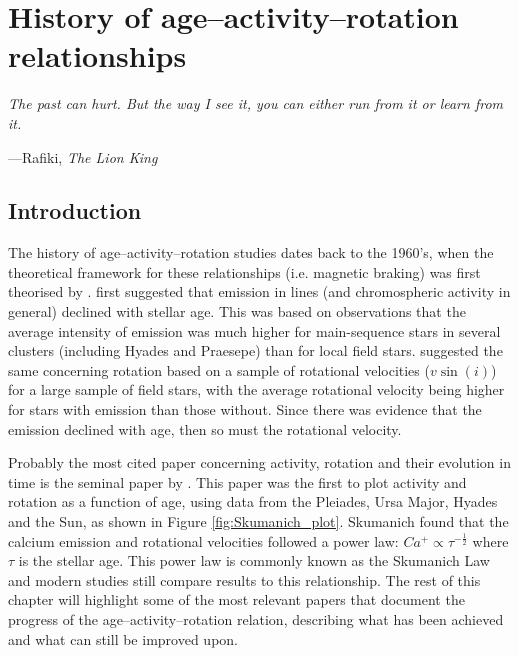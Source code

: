 
\chapter{History of age--activity--rotation relationships} %

\label{Chapter2} %


\epigraph{\itshape The past can hurt. But the way I see it, you can either run from it or learn from it.}{---Rafiki, \textit{The Lion King}}

\section{Introduction}

The history of age--activity--rotation studies dates back to the 1960's, when the theoretical framework for these relationships (i.e. magnetic braking) was first theorised by \citet{Schatzman_1962}. \citet{Wilson_1963} first suggested that emission in \caII lines (and chromospheric activity in general) declined with stellar age. This was based on observations that the average intensity of \caII emission was much higher for main-sequence stars in several clusters (including Hyades and Praesepe) than for local field stars. \citet{Kraft_1967} suggested the same concerning rotation based on a sample of rotational velocities ($v\sin(i)$) for a large sample of field stars, with the average rotational velocity being higher for stars with \caII emission than those without. Since there was evidence that the \caII emission declined with age, then so must the rotational velocity.

Probably the most cited paper concerning activity, rotation and their evolution in time is the seminal paper by \citet{Skumanich_1972}. This paper was the first to plot activity and rotation as a function of age, using data from the Pleiades, Ursa Major, Hyades and the Sun, as shown in Figure \ref{fig:Skumanich_plot}. Skumanich found that the calcium emission and rotational velocities followed a power law: $Ca^{+} \propto \tau^{-\frac{1}{2}}$ where $\tau$ is the stellar age. This power law is commonly known as the Skumanich Law and modern studies still compare results to this relationship. The rest of this chapter will highlight some of the most relevant papers that document the progress of the age--activity--rotation relation, describing what has been achieved and what can still be improved upon.

